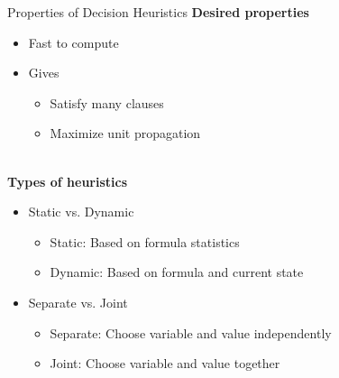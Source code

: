 \documentclass[t]{sdqbeamer}
\begin{document}
\begin{frame}{Properties of Decision Heuristics}
\textbf{Desired properties}\\[1ex]
\begin{itemize}\setlength{\itemsep}{1ex}
	\item Fast to compute
	\item Gives \\[3pt]
	\pause
	\begin{itemize}\setlength{\itemsep}{1ex}
		\item Satisfy many clauses
		\item Maximize unit propagation
	\end{itemize}
\end{itemize}
~\\
\pause
\textbf{Types of heuristics}\\[1ex]
\begin{itemize}\setlength{\itemsep}{1ex}
	\item Static vs. Dynamic\\[3pt]
	\begin{itemize}\setlength{\itemsep}{1ex}
		\item Static: Based on formula statistics
		\item Dynamic: Based on formula and current state
	\end{itemize}
	\item Separate vs. Joint\\[3pt]
	\begin{itemize}\setlength{\itemsep}{1ex}
		\item Separate: Choose variable and value independently
		\item Joint: Choose variable and value together
	\end{itemize}
\end{itemize}
\end{frame}
\end{document}

